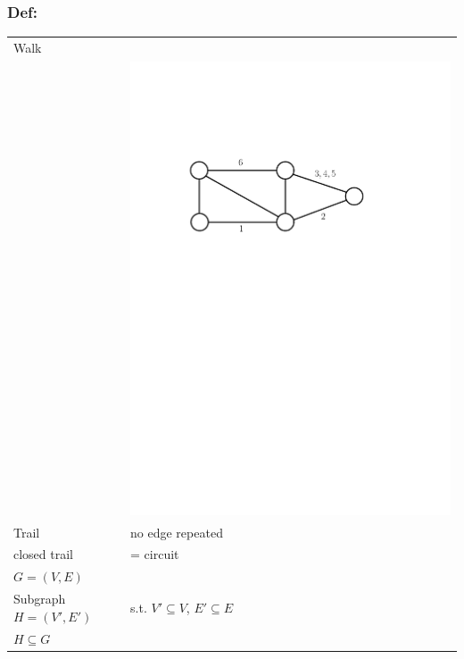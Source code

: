 \subsubsection*{Def:}
\begin{tabular}{l l}
Walk \\
	& \includegraphics[scale=.5]{01_graph_theory/pics/walk.pdf}\\

Trail	& no edge repeated \\

closed trail	& = circuit \\

$G=(V,E)$ \\
Subgraph $ H = (V',E')$	& s.t. $V' \subseteq V$, $E' \subseteq E$ \\
$H \subseteq G$ \\

\end{tabular}

